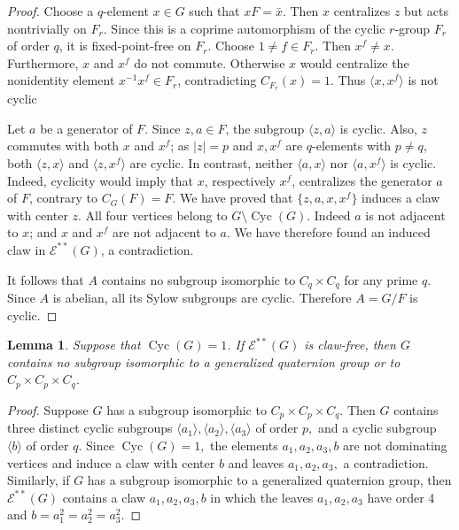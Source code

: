 \documentclass[preprint,11pt]{elsarticle}
\newcommand{\cyc}{\operatorname{Cyc}}
\newtheorem{lemma}[theorem]{\bf Lemma}
\begin{document}
\begin{proof}
Choose a $q$-element $x\in G$ such that $xF=\bar x.$  Then $x$ centralizes
$z$ but acts nontrivially on $F_r$.  Since this is a
coprime automorphism of the cyclic $r$-group $F_r$ of order $q$, it is
fixed-point-free on $F_r$.  Choose $1\ne f\in F_r$.  Then
$
   x^f\ne x.
$
Furthermore, $x$ and $x^f$ do not commute.  Otherwise $x$ would centralize
the nonidentity element $x^{-1}x^f\in F_r$, contradicting
$C_{F_r}(x)=1$.  Thus
$\langle x,x^f\rangle$ is not cyclic

Let $a$ be a generator of $F$.  Since $z,a\in F$, the subgroup
$\langle z,a\rangle$ is cyclic.  Also, $z$ commutes with both $x$ and $x^f$;
as $|z|=p$ and $x,x^f$ are $q$-elements with $p\ne q$, both
$
   \langle z,x\rangle$
and $\langle z,x^f\rangle
$
are cyclic.
In contrast, neither $\langle a,x\rangle$ nor $\langle a,x^f\rangle$ is
cyclic.  Indeed, cyclicity would imply that $x$, respectively $x^f$,
centralizes the generator $a$ of $F$, contrary to
$C_G(F)=F$. We have proved that $\{z,a,x,x^f\}$
induces a claw with center $z$.
All four vertices belong to $G\setminus\cyc(G)$.
Indeed  $a$ is not adjacent to $x$; and $x$ and $x^f$ are not
adjacent to $a$.  We have therefore found an induced claw in
$\mathcal E^{**}(G)$, a contradiction.

It follows that $A$ contains no subgroup isomorphic to $C_q\times C_q$ for
any prime $q$.  Since $A$ is abelian, all its Sylow subgroups are cyclic.
Therefore $A=G/F$ is cyclic.
\end{proof}

\begin{lemma}\label{excludedsbgs}
	Suppose that $\cyc(G) =1$. If $\mathcal{E}^{**}(G)$ is claw-free, 
	then $G$ contains no subgroup isomorphic to a generalized quaternion 
	group or to $C_p \times C_p \times C_q$.
\end{lemma}

\begin{proof}
	Suppose $G$ has a subgroup isomorphic to $C_p\times C_p\times C_q.$ Then $G$ contains three distinct cyclic subgroups $\langle a_1\rangle, \langle a_2\rangle, \langle a_3\rangle$ of order $p,$ and a cyclic subgroup $\langle b\rangle$ of order $q.$ Since $\cyc(G)=1,$ the elements $a_1, a_2, a_3, b$ are not dominating vertices and induce a claw with center $b$ and leaves  $a_1, a_2, a_3,$ a contradiction. Similarly,  if $G$ has a subgroup isomorphic to a generalized quaternion group, then $\mathcal E^{**}(G)$ contains a claw $a_1,a_2,a_3,b$ in which the leaves $a_1,a_2,a_3$ have order 4 and $b=a_1^2=a_2^2=a_3^2.$
\end{proof}
\end{document}
